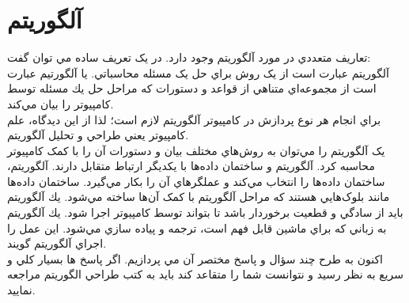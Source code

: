 \documentclass{book}
\begin{document}
\section*{آلگوریتم}
تعاريف متعددي در مورد آلگوريتم وجود دارد. در يک تعريف ساده مي توان گفت: \\
آلگوريتم عبارت است از يک روش براي حل يک مسئله محاسباتي. يا آلگورتيم عبارت است از مجموعه‌اي متناهي از قواعد و دستورات كه مراحل حل يك مسئله توسط کامپيوتر را بيان مي‌كند.\\
براي انجام هر نوع پردازش در كامپيوتر آلگوريتم لازم است؛ لذا از اين ديدگاه، علم كامپيوتر يعني طراحي و تحليل آلگوريتم.\\
يک آلگوريتم را مي‌توان به روش‌هاي مختلف بيان و دستورات آن را با کمک کامپيوتر محاسبه کرد. آلگوريتم و ساختمان داده‌ها با يکديگر ارتباط متقابل دارند. آلگوريتم، ساختمان داده‌ها را انتخاب مي‌کند و عملگرهاي آن‌ را بكار مي‌گيرد. ساختمان داده‌ها مانند بلوک‌هايي هستند که مراحل آلگوريتم با کمک آن‌ها ساخته مي‌شود. يك آلگوريتم بايد از سادگي و قطعيت برخوردار باشد تا بتواند توسط کامپيوتر اجرا شود. يك آلگوريتم به زباني كه براي ماشين قابل فهم است، ترجمه و پياده سازي مي‌شود. اين عمل را اجراي آلگوريتم گويند.\\
اکنون به طرح چند سؤال و پاسخ مختصر آن مي پردازيم. اگر پاسخ ها بسيار کلي و سريع به نظر رسيد و نتوانست شما را متقاعد کند بايد به کتب طراحي الگوريتم مراجعه نماييد.
\end{document}
